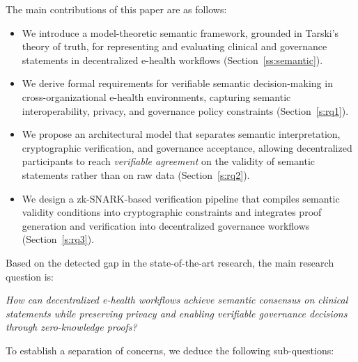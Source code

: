 \documentclass[journal]{IEEEtran}
\begin{document}
The main contributions of this paper are as follows:
\begin{itemize}

\item We introduce a model-theoretic semantic framework, grounded in Tarski's theory of truth, for representing and evaluating clinical and governance statements in decentralized e-health workflows (Section~\ref{ss:semantic}).

\item We derive formal requirements for verifiable semantic decision-making in cross-organizational e-health environments, capturing semantic interoperability, privacy, and governance policy constraints (Section~\ref{s:rq1}).

\item We propose an architectural model that separates semantic interpretation, cryptographic verification, and governance acceptance, allowing decentralized participants to reach \emph{verifiable agreement} on the validity of semantic statements rather than on raw data (Section~\ref{s:rq2}).

\item We design a zk-SNARK-based verification pipeline that compiles semantic validity conditions into cryptographic constraints and integrates proof generation and verification into decentralized governance workflows (Section~\ref{s:rq3}).

\end{itemize}


\noindent Based on the detected gap in the state-of-the-art research, the main research question is:

\begin{description}[leftmargin=\IEEElabelindentfactor\IEEElabelindent,labelsep=0.5em, style=nextline]
\item[\textbf{Main RQ}] \textit{How can decentralized e-health workflows achieve semantic consensus on clinical statements while preserving privacy and enabling verifiable governance decisions through zero-knowledge proofs?}
\end{description}

\noindent To establish a separation of concerns, we deduce the following sub-questions:
\end{document}
